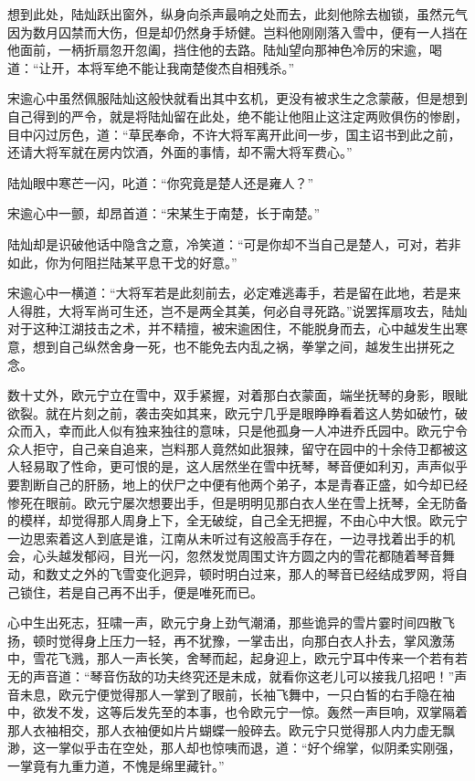 想到此处，陆灿跃出窗外，纵身向杀声最响之处而去，此刻他除去枷锁，虽然元气因为数月囚禁而大伤，但是却仍然身手矫健。岂料他刚刚落入雪中，便有一人挡在他面前，一柄折扇忽开忽阖，挡住他的去路。陆灿望向那神色冷厉的宋逾，喝道：“让开，本将军绝不能让我南楚俊杰自相残杀。”

宋逾心中虽然佩服陆灿这般快就看出其中玄机，更没有被求生之念蒙蔽，但是想到自己得到的严令，就是将陆灿留在此处，绝不能让他阻止这注定两败俱伤的惨剧，目中闪过厉色，道：“草民奉命，不许大将军离开此间一步，国主诏书到此之前，还请大将军就在房内饮酒，外面的事情，却不需大将军费心。”

陆灿眼中寒芒一闪，叱道：“你究竟是楚人还是雍人？”

宋逾心中一颤，却昂首道：“宋某生于南楚，长于南楚。”

陆灿却是识破他话中隐含之意，冷笑道：“可是你却不当自己是楚人，可对，若非如此，你为何阻拦陆某平息干戈的好意。”

宋逾心中一横道：“大将军若是此刻前去，必定难逃毒手，若是留在此地，若是来人得胜，大将军尚可生还，岂不是两全其美，何必自寻死路。”说罢挥扇攻去，陆灿对于这种江湖技击之术，并不精擅，被宋逾困住，不能脱身而去，心中越发生出寒意，想到自己纵然舍身一死，也不能免去内乱之祸，拳掌之间，越发生出拼死之念。

数十丈外，欧元宁立在雪中，双手紧握，对着那白衣蒙面，端坐抚琴的身影，眼眦欲裂。就在片刻之前，袭击突如其来，欧元宁几乎是眼睁睁看着这人势如破竹，破众而入，幸而此人似有独来独往的意味，只是他孤身一人冲进乔氏园中。欧元宁令众人拒守，自己亲自追来，岂料那人竟然如此狠辣，留守在园中的十余侍卫都被这人轻易取了性命，更可恨的是，这人居然坐在雪中抚琴，琴音便如利刃，声声似乎要割断自己的肝肠，地上的伏尸之中便有他两个弟子，本是青春正盛，如今却已经惨死在眼前。欧元宁屡次想要出手，但是明明见那白衣人坐在雪上抚琴，全无防备的模样，却觉得那人周身上下，全无破绽，自己全无把握，不由心中大恨。欧元宁一边思索着这人到底是谁，江南从未听过有这般高手存在，一边寻找着出手的机会，心头越发郁闷，目光一闪，忽然发觉周围丈许方圆之内的雪花都随着琴音舞动，和数丈之外的飞雪变化迥异，顿时明白过来，那人的琴音已经结成罗网，将自己锁住，若是自己再不出手，便是唯死而已。

心中生出死志，狂啸一声，欧元宁身上劲气潮涌，那些诡异的雪片霎时间四散飞扬，顿时觉得身上压力一轻，再不犹豫，一掌击出，向那白衣人扑去，掌风激荡中，雪花飞溅，那人一声长笑，舍琴而起，起身迎上，欧元宁耳中传来一个若有若无的声音道：“琴音伤敌的功夫终究还是未成，就看你这老儿可以接我几招吧！”声音未息，欧元宁便觉得那人一掌到了眼前，长袖飞舞中，一只白皙的右手隐在袖中，欲发不发，这等后发先至的本事，也令欧元宁一惊。轰然一声巨响，双掌隔着那人衣袖相交，那人衣袖便如片片蝴蝶一般碎去。欧元宁只觉得那人内力虚无飘渺，这一掌似乎击在空处，那人却也惊咦而退，道：“好个绵掌，似阴柔实刚强，一掌竟有九重力道，不愧是绵里藏针。”

